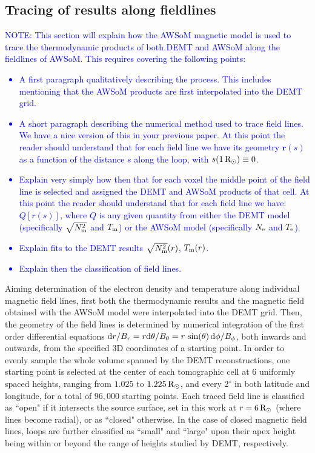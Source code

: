 \documentclass[namedreferences]{solarphysics}
\newcommand{\mrsun}{{\rm R_\odot}}
\newcommand{\Te}{T_{\rm e}}
\newcommand{\Tm}{T_{\rm m}}
\newcommand{\Ne}{N_{\rm e}}
\newcommand{\Nsqm}{N^2_{{\rm m}}}
\newcommand{\sqravgN}{\sqrt{\Nsqm}}
\def\notebyalbert#1{\textcolor{blue}{NOTE: #1}}
\begin{document}
\begin{article}
\subsection{Tracing of results along fieldlines}\label{trace} 

\noindent\notebyalbert{This section will explain how the AWSoM magnetic model is used to trace the thermodynamic products of both DEMT and AWSoM along the fieldlines of AWSoM. This requires covering the following points:
\begin{itemize}
  \item A first paragraph qualitatively describing the process. This includes mentioning that the AWSoM products are first interpolated into the DEMT grid.
  \item A short paragraph describing the numerical method used to trace field lines. We have a nice version of this in your previous paper.  At this point the reader should understand that for each field line we have its geometry $\mathbf{r}(s)$ as a function of the distance $s$ along the loop, with $s(1\,\mrsun)\equiv 0$. 
  \item Explain very simply how then that for each voxel the middle point of the field line is selected and assigned the DEMT and AWSoM products of that cell. At this point the reader should understand that for each field line we have: $Q[r(s)]$, where $Q$ is any given quantity from either the DEMT model (specifically $\sqravgN$ and $\Tm$) or the AWSoM model (specifically $\Ne$ and $\Te$).
  \item Explain fits to the DEMT results  $\sqravgN(r)$, $\Tm(r)$.
  \item Explain then the classification of field lines.
\end{itemize}
} 

Aiming determination of the electron density and temperature along individual magnetic field lines, first both the thermodynamic results and the magnetic field obtained with the AWSoM model were interpolated into the DEMT grid. Then, the geometry of the field lines is determined by numerical integration of the first order differential equations  ${\rm d}r/B_r = r{\rm d}\theta/B_\theta = r\,\sin(\theta)\,{\rm d}\phi/B_\phi$, both inwards and outwards, from the specified 3D coordinates of a starting point. In order to evenly sample the whole volume spanned by the DEMT reconstructions, one starting point is selected at the center of each tomographic cell at 6 uniformly spaced heights, ranging from $1.025$ to $1.225\,\mrsun$, and every 2$^\circ$ in both latitude and longitude, for a total of $96,000$ starting points. Each traced field line is classified as ``open" if it intersects the source surface, set in this work at $r=6\,\mrsun$ (where lines become radial), or as ``closed" otherwise. In the case of closed magnetic field lines, loops {are} further classified as ``small" and ``large" upon their apex height being within or beyond the range of heights studied by DEMT, respectively.


\end{article}
\end{document}
